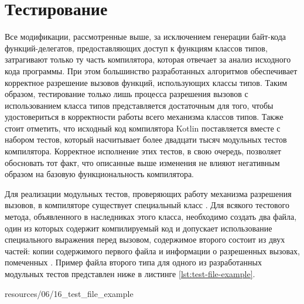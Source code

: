 \section{Тестирование}

Все модификации, рассмотренные выше, за исключением генерации байт-кода функций-делегатов, предоставляющих доступ к функциям классов типов, затрагивают только ту часть компилятора, которая отвечает за анализ исходного кода программы. При этом большинство разработанных алгоритмов обеспечивает корректное разрешение вызовов функций, использующих классы типов. Таким образом, тестирование только лишь процесса разрешения вызовов с использованием класса типов представляется достаточным для того, чтобы удостовериться в корректности работы всего механизма классов типов. Также стоит отметить, что исходный код компилятора Kotlin поставляется вместе с набором тестов, который насчитывает более двадцати тысяч модульных тестов компилятора. Корректное исполнение этих тестов, в свою очередь, позволяет обосновать тот факт, что описанные выше изменения не влияют негативным образом на базовую функциональность компилятора. 

Для реализации модульных тестов, проверяющих работу механизма разрешения вызовов, в компиляторе существует специальный класс . Для всякого тестового метода, объявленного в наследниках этого класса, необходимо создать два файла, один из которых содержит компилируемый код и допускает использование специального выражения  перед вызовом, содержимое второго состоит из двух частей: копии содержимого первого файла и информации о разрешенных вызовах, помеченных . Пример файла второго типа для одного из разработанных модульных тестов представлен ниже в листинге \ref{lst:test-file-example}.


{resources/06/16_test_file_example}  